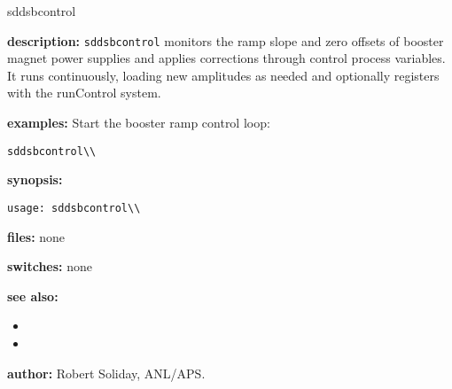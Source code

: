 %
\begin{sddsprog}{sddsbcontrol}
\item \textbf{description:}
\verb+sddsbcontrol+ monitors the ramp slope and zero offsets of booster magnet power supplies and applies corrections through control process variables. It runs continuously, loading new amplitudes as needed and optionally registers with the runControl system.

\item \textbf{examples:}
Start the booster ramp control loop:
\begin{verbatim}
sddsbcontrol\\
\end{verbatim}

\item \textbf{synopsis:}
\begin{verbatim}
usage: sddsbcontrol\\
\end{verbatim}

\item \textbf{files:} none

\item \textbf{switches:} none

\item \textbf{see also:}
\begin{itemize}
  \item {}
  \item {}
\end{itemize}

\item \textbf{author:} Robert Soliday, ANL/APS.
\end{sddsprog}
